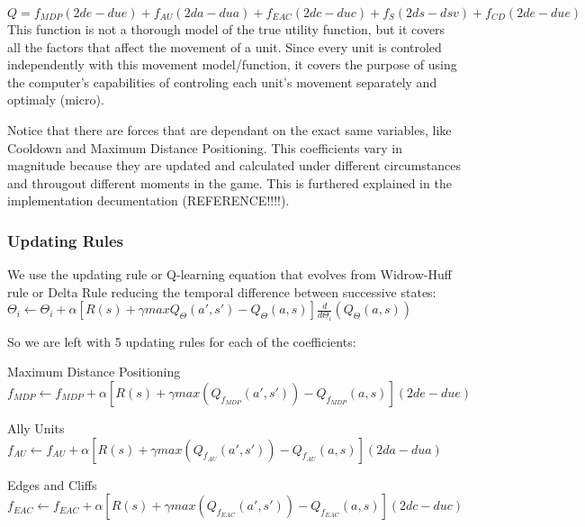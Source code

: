 $Q = f_{MDP} (2de - due) + f_{AU} (2da - dua) + f_{EAC} (2dc - duc) + f_{S}  (2ds - dsv) + f_{CD} (2de - due)$ \\ 

This function is not a thorough model of the true utility function, but it covers all the factors that affect the movement of a unit. Since every unit is controled independently with this movement model/function, it covers the purpose of using the computer's capabilities of controling each unit's movement separately and optimaly (micro).

Notice that there are forces that are dependant on the exact same variables, like Cooldown and Maximum Distance Positioning. This coefficients vary in magnitude because they are updated and calculated under different circumstances and througout different moments in the game. This is furthered explained in the implementation decumentation (REFERENCE!!!!). 

\subsubsection{Updating Rules}

We use the updating rule or Q-learning equation that evolves from Widrow-Huff rule or Delta Rule reducing the temporal difference between successive states:  \cite[p779]{rl} \\ 
 
$\Theta_i \leftarrow \Theta_i + \alpha [ R(s) + \gamma maxQ_\Theta(a',s')-Q_\Theta(a,s) ] \frac{d}{d\Theta_i}(Q_\Theta(a,s))$ \\ 


\begin{flushleft}
So we are left with 5 updating rules for each of the coefficients:
\end{flushleft} 

\begin{flushleft}
Maximum Distance Positioning 
$f_{MDP}  \leftarrow f_{MDP}  + \alpha [ R(s) + \gamma max(Q_f_{MDP} (a',s'))-Q_f_{MDP} (a,s) ](2de - due)$
\end{flushleft} 

\begin{flushleft}
Ally Units  \\ 
$f_{AU}  \leftarrow f_{AU} + \alpha [ R(s) + \gamma max(Q_f_{AU} (a',s'))-Q_f_{AU} (a,s) ](2da - dua)$ 
\end{flushleft} 

\begin{flushleft}
Edges and Cliffs
$f_{EAC}  \leftarrow f_{EAC}  + \alpha [ R(s) + \gamma max(Q_f_{EAC} (a',s'))-Q_f_{EAC} (a,s) ] (2dc - duc)$ 
\end{flushleft} 

